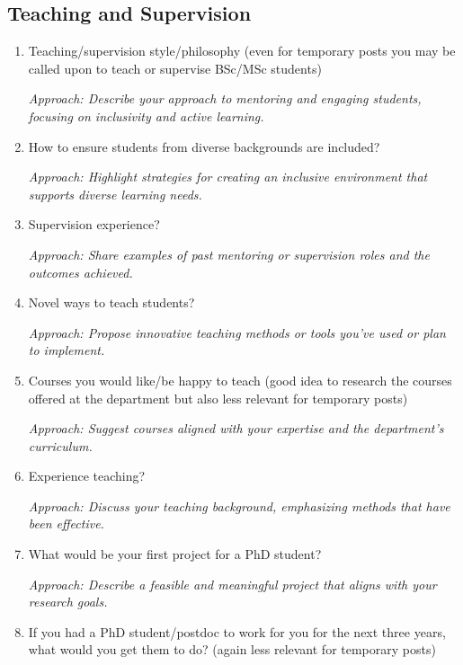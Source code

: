 \documentclass[12pt]{article}
\numberwithin{equation}{section}
\begin{document}
\subsection{Teaching and Supervision}
\begin{enumerate}
    \item Teaching/supervision style/philosophy (even for temporary posts you may be called upon to teach or supervise BSc/MSc students)
    
    \textit{Approach: Describe your approach to mentoring and engaging students, focusing on inclusivity and active learning.}

    \item How to ensure students from diverse backgrounds are included?
    
    \textit{Approach: Highlight strategies for creating an inclusive environment that supports diverse learning needs.}

    \item Supervision experience?
    
    \textit{Approach: Share examples of past mentoring or supervision roles and the outcomes achieved.}

    \item Novel ways to teach students?
    
    \textit{Approach: Propose innovative teaching methods or tools you’ve used or plan to implement.}

    \item Courses you would like/be happy to teach (good idea to research the courses offered at the department but also less relevant for temporary posts)
    
    \textit{Approach: Suggest courses aligned with your expertise and the department’s curriculum.}

    \item Experience teaching?
    
    \textit{Approach: Discuss your teaching background, emphasizing methods that have been effective.}

    \item What would be your first project for a PhD student?
    
    \textit{Approach: Describe a feasible and meaningful project that aligns with your research goals.}

    \item If you had a PhD student/postdoc to work for you for the next three years, what would you get them to do? (again less relevant for temporary posts)
    

\end{enumerate}
\end{document}

